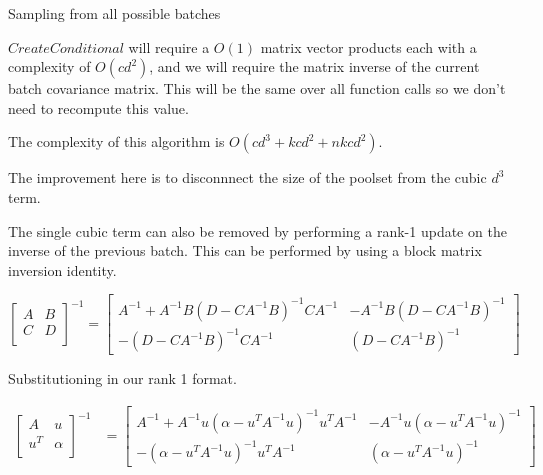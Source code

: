 \documentclass[12pt, a4paper]{report}
\theoremstyle{definition}
\begin{document}
\begin{algorithm}[H]
    \SetAlgoLined
     \caption{Sampling from all possible batches}
\end{algorithm}

$CreateConditional$ will require a $O(1)$ matrix vector products each with a complexity of $O(cd^2)$, and we will require the matrix inverse of the current batch covariance matrix. This will be the same over all function calls so we don't need to recompute this value.

The complexity of this algorithm is $O\left(cd^3 + kcd^2 + nkcd^2 \right)$.

The improvement here is to disconnnect the size of the poolset from the cubic $d^3$ term.

The single cubic term can also be removed by performing a rank-1 update on the inverse of the previous batch. This can be performed by using a block matrix inversion identity.

$$\begin{bmatrix}
    A & B \\
    C & D \\
\end{bmatrix}^{-1} = \begin{bmatrix}
    A^{-1} + A^{-1} B \left(D - C A^{-1} B \right)^{-1} C A^{-1} & -A^{-1} B \left( D - C A^{-1}B\right)^{-1} \\
    - \left(D - CA^{-1}B \right)^{-1} C A^{-1} & \left(D - C A^{-1} B\right)^{-1}
\end{bmatrix} $$ 

Substitutioning in our rank 1 format.

\begin{align*}
    \begin{bmatrix}
        A & u \\
        u^T & \alpha \\
    \end{bmatrix}^{-1} &= \begin{bmatrix}
        A^{-1} + A^{-1} u \left(\alpha - u^T A^{-1} u \right)^{-1} u^T  A^{-1} & -A^{-1} u \left( \alpha - u^T A^{-1}u\right)^{-1} \\
        - \left(\alpha - u^T A^{-1}u \right)^{-1} u^T A^{-1} & \left(\alpha - u^T A^{-1} u\right)^{-1}
    \end{bmatrix}
\end{align*}
\end{document}

